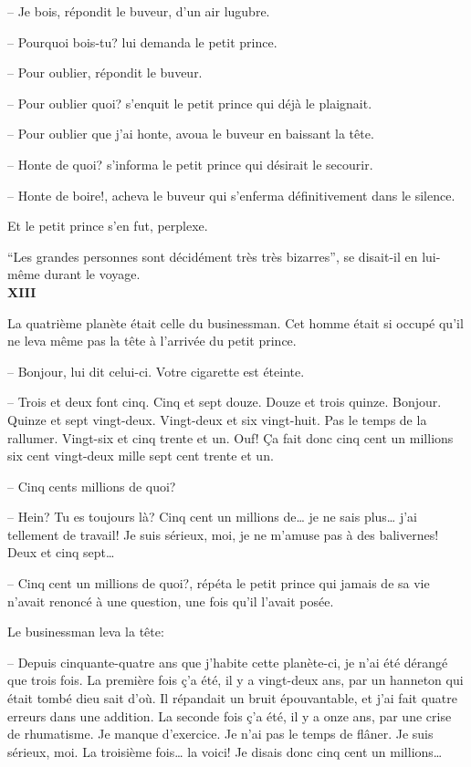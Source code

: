 \begin{Parallel}[p]{}{}
{-- Je bois, répondit le buveur, d'un air lugubre.

-- Pourquoi bois-tu? lui demanda le petit prince.

-- Pour oublier, répondit le buveur.

-- Pour oublier quoi? s'enquit le petit prince qui
déjà le plaignait.

-- Pour oublier que j'ai honte, avoua le buveur en baissant la tête.

-- Honte de quoi? s'informa le petit prince qui
désirait le secourir.

-- Honte de boire!, acheva le buveur qui s'enferma définitivement dans le silence.

Et le petit prince s'en fut, perplexe.

``Les grandes personnes sont décidément très très
bizarres'', se disait-il en lui-même durant le voyage.\\

\textbf{XIII}

La quatrième planète était celle du businessman.
Cet homme était si occupé qu'il ne leva même pas la
tête à l'arrivée du petit prince.

-- Bonjour, lui dit celui-ci. Votre cigarette est
éteinte.

-- Trois et deux font cinq. Cinq et sept douze.
Douze et trois quinze. Bonjour. Quinze et sept vingt-deux. Vingt-deux et six vingt-huit. Pas le temps de la
rallumer. Vingt-six et cinq trente et un. Ouf! Ça fait
donc cinq cent un millions six cent vingt-deux mille
sept cent trente et un.

-- Cinq cents millions de quoi?

-- Hein? Tu es toujours là? Cinq cent un millions de\ldots{} je ne sais plus\ldots{} j'ai tellement de travail!
Je suis sérieux, moi, je ne m'amuse pas à des balivernes! Deux et cinq sept\ldots{}

-- Cinq cent un millions de quoi?, répéta le
petit prince qui jamais de sa vie n'avait renoncé à
une question, une fois qu'il l'avait posée.

Le businessman leva la tête:

-- Depuis cinquante-quatre ans que j'habite cette
planète-ci, je n'ai été dérangé que trois fois. La première fois ç'a été, il y a vingt-deux ans, par un hanneton qui était tombé dieu sait d'où. Il répandait un
bruit épouvantable, et j'ai fait quatre erreurs dans
une addition. La seconde fois ç'a été, il y a onze ans,
par une crise de rhumatisme. Je manque d’exercice.
Je n'ai pas le temps de flâner. Je suis sérieux, moi. La
troisième fois\ldots{} la voici! Je disais donc cinq cent un
millions\ldots{}

}
\end{Parallel}
